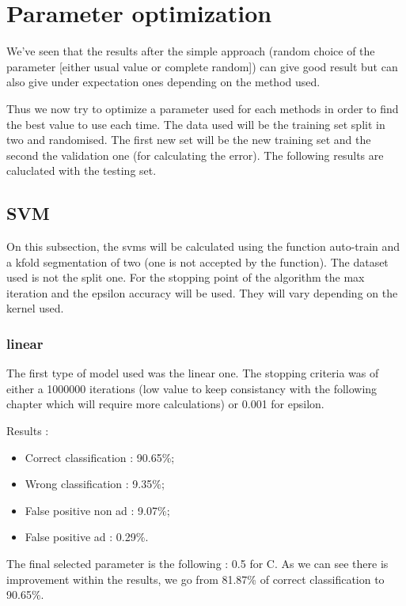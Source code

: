 \section{Parameter optimization}

We've seen that the results after the simple approach (random choice of the parameter [either usual value or complete random]) can give good result but can also give under expectation ones depending on the method used.

Thus we now try to optimize a parameter used for each methods in order to find the best value to use each time. The data used will be the training set split in two and randomised. The first new set will be the new training set and the second the validation one (for calculating the error). The following results are caluclated with the testing set.

\subsection{SVM}

On this subsection, the svms will be calculated using the function auto-train and a kfold segmentation of two (one is not accepted by the function). The dataset used is not the split one.
For the stopping point of the algorithm the max iteration and the epsilon accuracy will be used. They will vary depending on the kernel used.

\subsubsection{linear}

The first type of model used was the linear one. The stopping criteria was of either a 1000000 iterations (low value to keep consistancy with the following chapter which will require more calculations) or 0.001 for epsilon.

Results :
\begin{itemize}
  \item Correct classification : 90.65\%;
  \item Wrong classification : 9.35\%;
  \item False positive non ad : 9.07\%;
  \item False positive ad : 0.29\%.
\end{itemize}

The final selected parameter is the following : 0.5 for C. As we can see there is improvement within the results, we go from 81.87\% of correct classification to 90.65\%.

